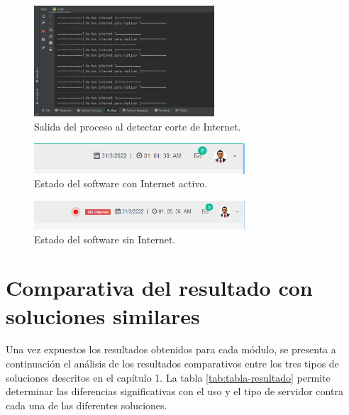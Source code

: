 \begin{figure}[htpb]
\centering 
\includegraphics[width=0.6\textwidth]{./Figures/test/replicador/desconexion3.png}
\caption{Salida del proceso al detectar corte de Internet.}
\label{fig:inter1}
\end{figure}
\vspace{0.25cm}
\begin{figure}[htpb]
\centering 
\includegraphics[width=0.7\textwidth]{./Figures/test/replicador/desconexion1.png}
\caption{Estado del software con Internet activo.}
\label{fig:inter2}
\end{figure}
\begin{figure}[htpb]
\centering 
\includegraphics[width=0.7\textwidth]{./Figures/test/replicador/desconexion2.png}
\caption{Estado del software sin Internet.}
\label{fig:inter3}
\end{figure}


\section{Comparativa del resultado con soluciones similares}

Una vez expuestos los resultados obtenidos para cada módulo, se presenta a continuación el análisis de los resultados comparativos entre los tres tipos de soluciones descritos en el capítulo 1. La tabla \ref{tab:tabla-resultado} permite determinar las diferencias significativas con el uso y el tipo de servidor contra cada una de las diferentes soluciones.


